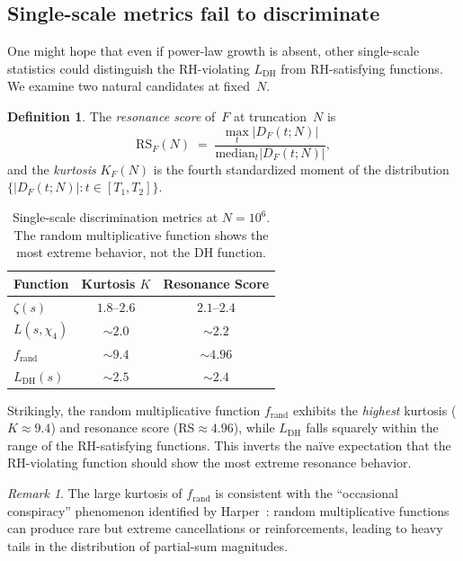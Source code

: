 \documentclass[11pt]{amsart}
\theoremstyle{definition}
\newtheorem{definition}[theorem]{Definition}
\theoremstyle{remark}
\newtheorem{remark}[theorem]{Remark}
\renewcommand{\DH}{\mathrm{DH}}
\newcommand{\abs}[1]{\lvert #1 \rvert}
\begin{document}
\subsection{Single-scale metrics fail to discriminate}
\label{ssec:single-scale}

One might hope that even if power-law growth is absent, other
single-scale statistics could distinguish the RH-violating
$L_{\DH}$ from RH-satisfying functions.  We examine two natural
candidates at fixed~$N$.

\begin{definition}
The \emph{resonance score} of~$F$ at truncation~$N$ is
\begin{equation}\label{eq:RS}
  \mathrm{RS}_F(N) \;=\; \frac{\max_t \abs{D_F(t;N)}}
    {\mathrm{median}_t \abs{D_F(t;N)}},
\end{equation}
and the \emph{kurtosis} $K_F(N)$ is the fourth standardized moment of
the distribution $\{\abs{D_F(t;N)} : t \in [T_1,T_2]\}$.
\end{definition}

\begin{table}[ht]
\centering
\caption{Single-scale discrimination metrics at $N = 10^6$.
  The random multiplicative function shows the most extreme
  behavior, not the DH function.}
\label{tab:single-scale}
\begin{tabular}{@{}lcc@{}}
\toprule
Function & Kurtosis $K$ & Resonance Score \\
\midrule
$\zeta(s)$           & $1.8$--$2.6$ & $2.1$--$2.4$ \\
$L(s,\chi_4)$        & $\sim 2.0$   & $\sim 2.2$ \\
$f_{\mathrm{rand}}$  & $\sim 9.4$   & $\sim 4.96$ \\
$L_{\DH}(s)$         & $\sim 2.5$   & $\sim 2.4$ \\
\bottomrule
\end{tabular}
\end{table}

Strikingly, the random multiplicative function $f_{\mathrm{rand}}$
exhibits the \emph{highest} kurtosis ($K \approx 9.4$) and resonance
score ($\mathrm{RS} \approx 4.96$), while $L_{\DH}$ falls squarely
within the range of the RH-satisfying functions.  This inverts the
na\"ive expectation that the RH-violating function should show the
most extreme resonance behavior.

\begin{remark}
The large kurtosis of $f_{\mathrm{rand}}$ is consistent with the
``occasional conspiracy'' phenomenon identified by
Harper~\cite{Harper2013}: random multiplicative functions can produce
rare but extreme cancellations or reinforcements, leading to heavy
tails in the distribution of partial-sum magnitudes.
\end{remark}
\end{document}
